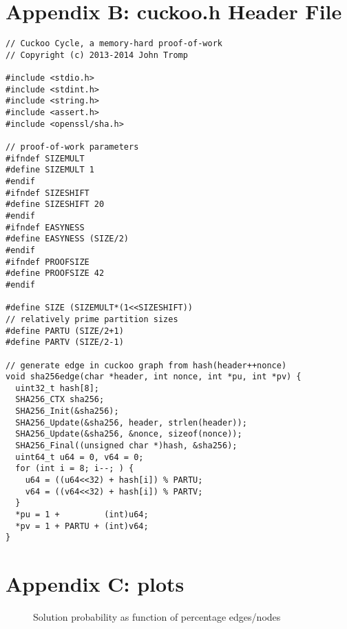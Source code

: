 \documentclass[11pt, oneside]{article}
\begin{document}
\section{Appendix B: cuckoo.h Header File}
\footnotesize
\begin{verbatim}
// Cuckoo Cycle, a memory-hard proof-of-work
// Copyright (c) 2013-2014 John Tromp

#include <stdio.h>
#include <stdint.h>
#include <string.h>
#include <assert.h>
#include <openssl/sha.h>

// proof-of-work parameters
#ifndef SIZEMULT 
#define SIZEMULT 1
#endif
#ifndef SIZESHIFT 
#define SIZESHIFT 20
#endif
#ifndef EASYNESS 
#define EASYNESS (SIZE/2)
#endif
#ifndef PROOFSIZE 
#define PROOFSIZE 42
#endif

#define SIZE (SIZEMULT*(1<<SIZESHIFT))
// relatively prime partition sizes
#define PARTU (SIZE/2+1)
#define PARTV (SIZE/2-1)

// generate edge in cuckoo graph from hash(header++nonce)
void sha256edge(char *header, int nonce, int *pu, int *pv) {
  uint32_t hash[8];
  SHA256_CTX sha256;
  SHA256_Init(&sha256);
  SHA256_Update(&sha256, header, strlen(header));
  SHA256_Update(&sha256, &nonce, sizeof(nonce));
  SHA256_Final((unsigned char *)hash, &sha256);
  uint64_t u64 = 0, v64 = 0;
  for (int i = 8; i--; ) {
    u64 = ((u64<<32) + hash[i]) % PARTU;
    v64 = ((v64<<32) + hash[i]) % PARTV;
  }
  *pu = 1 +         (int)u64;
  *pv = 1 + PARTU + (int)v64;
}
\end{verbatim}

\section{Appendix C: plots}

\begin{figure}
\centering
{}
\caption{Solution probability as function of percentage edges/nodes}
\label{solprob}
\end{figure}
\end{document}
